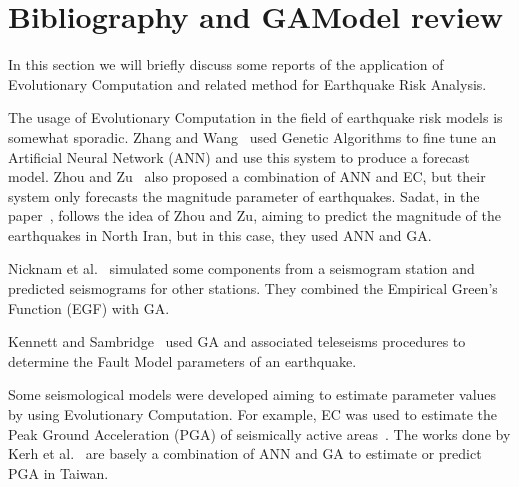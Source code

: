 \section{Bibliography and GAModel review}\label{estadoArte}
In this section we will briefly discuss some reports of the
application of Evolutionary Computation and related method for
Earthquake Risk Analysis.

The usage of Evolutionary Computation in the field of earthquake risk models is somewhat sporadic. Zhang and Wang~\cite{Zhang2012} used Genetic Algorithms to fine tune an Artificial Neural Network (ANN) and use this system to produce a forecast model. Zhou and Zu~\cite{Feiyan2014} also proposed a combination of ANN and EC, but
their system only forecasts the magnitude parameter of
earthquakes. Sadat, in the paper~\cite{sadat2015application}, follows
the idea of Zhou and Zu, aiming to predict the magnitude of the
earthquakes in North Iran, but in this case, they used ANN and GA.

Nicknam et al.~\cite{Nicknam2010} simulated some components from a seismogram station and predicted seismograms for other stations. They combined the Empirical Green’s Function (EGF) with GA. %

Kennett and Sambridge~\cite{Kennett1992} used GA and associated teleseisms procedures to determine the Fault Model parameters of an earthquake. %

Some seismological models were developed aiming to estimate parameter values by using Evolutionary Computation. For example, EC was used to estimate the Peak Ground Acceleration (PGA) of seismically active areas~\cite{Kermani2009,Cabalar2009,Kerh2010,Kerh2015}. 
The works done by Kerh et al.~\cite{Kerh2010, Kerh2015} are basely a combination of ANN and GA to estimate or predict PGA in Taiwan. %

